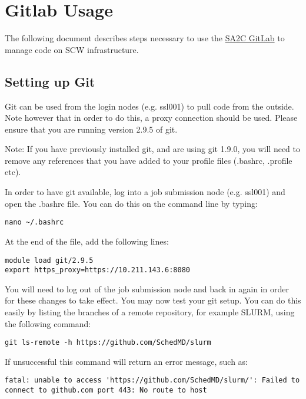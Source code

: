 \documentclass[11pt]{article}
\author{Mark Dawson}
\date{\today}
\title{}
\begin{document}
\tableofcontents

\section{Gitlab Usage}
\label{sec:org4a0911c}
The following document describes steps necessary to use the \href{https://sa2c-gitlab.swansea.ac.uk/}{SA2C GitLab} to manage code on SCW infrastructure.

\subsection{Setting up Git}
\label{sec:org3a2d41f}
Git can be used from the login nodes (e.g. ssl001) to pull code from the
outside. Note however that in order to do this, a proxy connection should be
used. Please ensure that you are running version 2.9.5 of git.

Note: If you have previously installed git, and are using git 1.9.0, you will
   need to remove any references that you have added to your profile files (.bashrc, .profile etc). 

In order to have git available, log into a job submission node (e.g. ssl001) and
   open the .bashrc file. You can do this on the command line by typing:

\begin{verbatim}
nano ~/.bashrc
\end{verbatim}

At the end of the file, add the following lines:

\begin{verbatim}
module load git/2.9.5
export https_proxy=https://10.211.143.6:8080
\end{verbatim}

You will need to log out of the job submission node and back in again in order
for these changes to take effect. You may now test your git setup. You can do
this easily by listing the branches of a remote repository, for example SLURM,
using the following command:

\begin{verbatim}
git ls-remote -h https://github.com/SchedMD/slurm
\end{verbatim}

If unsuccessful this command will return an error message, such as:

\begin{verbatim}
fatal: unable to access 'https://github.com/SchedMD/slurm/': Failed to connect to github.com port 443: No route to host
\end{verbatim}
\end{document}

